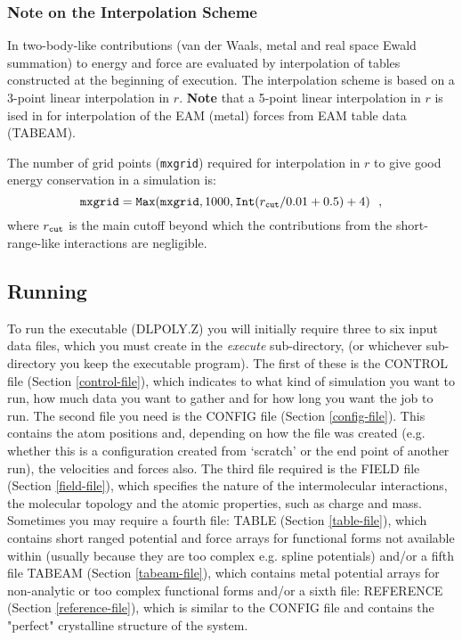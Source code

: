 \subsubsection{Note on the Interpolation Scheme}
\label{interpolation}

In \D two-body-like contributions (van der Waals,
metal and real space Ewald summation)
to energy and force are evaluated by interpolation of tables
constructed at the beginning of execution.  The \D interpolation
scheme is based on a 3-point linear interpolation in $r$.  {\bf Note}
that a 5-point linear interpolation in $r$ is ised in \D for
interpolation of the EAM (metal) forces from EAM table data (TABEAM).

The number of grid points ({\tt mxgrid}) required for
interpolation in $r$ to give good energy conservation in a
simulation is:
\[ {\tt mxgrid} = {\tt Max}({\tt mxgrid}, 1000, {\tt Int}(r_{\tt cut}/0.01 + 0.5) + 4)~~, \]
where $r_{\tt cut}$ is the main cutoff beyond which the
contributions from the short-range-like interactions are negligible.

\subsection{Running}

To run the \D executable (DLPOLY.Z) you will initially require
three to six input data files, which you must
create in the {\em execute} sub-directory, (or whichever
sub-directory you keep the executable program).  The first of
these is the CONTROL file (Section \ref{control-file}), which
indicates to \D what kind of simulation you want to run, how
much data you want to gather and for how long you want the job
to run.  The second file you need is the CONFIG file
(Section \ref{config-file}).  This contains the atom
positions and, depending on how the file was created (e.g. whether
this is a configuration created from `scratch' or the end point of
another run), the velocities and forces also.  The third file
required is the FIELD file (Section \ref{field-file}), which
specifies the nature of the intermolecular interactions, the
molecular topology and the atomic properties, such as charge and
mass.  Sometimes you may require a fourth file: TABLE (Section
\ref{table-file}), which contains short ranged potential and force
arrays for functional forms not available within \D (usually because
they are too complex e.g. spline potentials) and/or a fifth file
TABEAM (Section \ref{tabeam-file}), which contains metal potential
arrays for non-analytic or too complex functional forms and/or a
sixth file: REFERENCE (Section \ref{reference-file}), which is
similar to the CONFIG file and contains the "perfect" crystalline
structure of the system.

